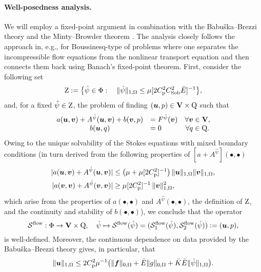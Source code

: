 \paragraph{Well-posedness analysis.} We will employ a fixed-point argument in combination with the Babu\v{s}ka--Brezzi theory \cite{boffi13} and the Minty--Browder theorem \cite{ciarlet13}. The analysis closely follows the approach in, e.g., \cite{alvarez21,caucao20} for Boussinesq-type of problems where one separates the incompressible flow equations from the nonlinear transport equation and then connects them back using Banach's fixed-point theorem. 
%
First, consider the following set
\begin{equation}\label{eq:def-W-psi}
 \mathrm{Z} := \bigl\{\hat\psi \in \Phi:\quad  \|\hat\psi\|_{1,\Omega} \leq {\mu}[{2 C_{\mathrm{p}}^2 C_{\mathrm{Sob}}^2 \bar{E} }]^{-1} \bigr\},
\end{equation}
 and, for a fixed $\hat{\psi} \in \mathrm{Z}$, the problem of finding $(\boldsymbol{u},p)\in \mathbf{V}\times \mathrm{Q}$ such that 
\begin{equation}\label{eq:Stokes}
\begin{array}{clc}
 a(\boldsymbol{u}, \boldsymbol{v}) + A^{\hat{\psi}} (\boldsymbol{u},\boldsymbol{v}) + b(\boldsymbol{v},p) & = F^{\hat{\psi}}(\boldsymbol{v}) & \forall \boldsymbol{v} \in \mathbf{V},\\
b(\boldsymbol{u}, q) & = 0 & \forall q \in \mathrm{Q}.
\end{array}
    \end{equation}
Owing to the unique solvability of the Stokes equations with mixed boundary conditions  \cite{ern04} (in turn derived from the following properties of $[a+A^{\hat{\psi}}](\bullet,\bullet)$
\begin{align}\label{eq:a+A-prop}
\nonumber \vert a(\boldsymbol{u},\boldsymbol{v}) + A^{\hat{\psi}}(\boldsymbol{u},\boldsymbol{v})\vert &\leq \bigl(\mu + {\mu}[{2 C_{\mathrm{p}}^2}]^{-1} \bigr)\, \Vert \boldsymbol{u}\Vert_{1,\Omega}\Vert \boldsymbol{v}\Vert_{1,\Omega}, \\ 
\vert a(\boldsymbol{v},\boldsymbol{v}) + A^{\hat{\psi}}(\boldsymbol{v},\boldsymbol{v})\vert &\geq {\mu}[{2 C_{\mathrm{p}}^2}]^{-1}\,\Vert \boldsymbol{v}\Vert_{1,\Omega}^2, 
\end{align}
which arise from the properties of $a(\bullet,\bullet)$ and $A^{\hat{\psi}}(\bullet,\bullet)$, the definition of $\mathrm{Z}$, and  the continuity and stability of $b(\bullet,\bullet)$), we conclude that the operator
\[\mathcal{S}^{\mathrm{flow}}: \Phi \to \mathbf{V} \times \mathrm{Q}, \quad \hat{\psi} \mapsto \mathcal{S}^{\mathrm{flow}}(\hat{\psi}) = (\mathcal{S}^{\mathrm{flow}}_1(\hat{\psi}),\mathcal{S}^{\mathrm{flow}}_2(\hat{\psi})):= (\boldsymbol{u}, p),\]
is well-defined. Moreover, the continuous dependence on data provided by the Babu\v{s}ka--Brezzi theory gives, in particular, that 
\begin{equation}\label{eq:stab-u}
\|\boldsymbol{u}\|_{1,\Omega} \leq 2 C_{\mathrm{p}}^2\mu^{-1} \bigl( \|\boldsymbol{f}\|_{0,\Omega} + \bar{E}\| g\|_{0,\Omega} + \bar{K}\bar{E}\|\hat{\psi}\|_{1,\Omega}\bigr). 
\end{equation}
